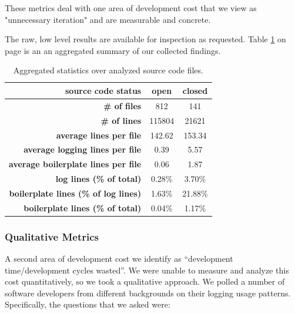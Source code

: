\documentclass[acmsmall,review,authorversion]{acmart}
\begin{document}
These metrics deal with one area of development cost that we view as "unnecessary iteration" and are measurable and concrete.

The raw, low level results are available for inspection as requested. Table \ref{tab:agg-data} on page \pageref{tab:agg-data} is an an aggregated summary of our collected findings.

\begin{table}[h]
\centering
\begin{tabular}{|r|c|c|}
\hline
\textbf{source code status}                  & \textbf{open}               & \textbf{closed}            \\ \hline
\textbf{\# of files}                         & 812                         & 141                        \\ \hline
\textbf{\# of lines}                         & 115804                      & 21621                      \\ \hline
\textbf{average lines per file}              & 142.62                      & 153.34                     \\ \hline
\textbf{average logging lines per file}      & 0.39                        & 5.57                       \\ \hline
\textbf{average boilerplate lines per file}  & 0.06                        & 1.87                       \\ \hline
\textbf{log lines (\% of total)}             & 0.28\%                      & 3.70\%                   \\ \hline
\textbf{boilerplate lines (\% of log lines)} & 1.63\%                      & 21.88\%                    \\ \hline
\textbf{boilerplate lines (\% of total)}     & 0.04\%                      & 1.17\%                     \\ \hline
\end{tabular}
\caption{Aggregated statistics over analyzed source code files.}
\label{tab:agg-data}
\end{table}

\subsubsection{Qualitative Metrics}

A second area of development cost we identify as ``development time/development cycles wasted''. We were unable to measure and analyze this cost quantitatively, so we took a qualitative approach. We polled a number of software developers from different backgrounds on their logging usage patterns. Specifically, the questions that we asked were:
\end{document}
